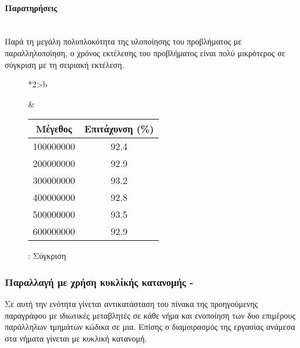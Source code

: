 \paragraph{Παρατηρήσεις}
\ \\
Παρά τη μεγάλη πολυπλοκότητα της υλοποίησης του προβλήματος με παραλληλοποίηση, ο χρόνος εκτέλεσης του προβλήματος είναι πολύ μικρότερος σε σύγκριση με τη σειριακή εκτέλεση.
\begin{figure}[h]
\begin{tabular}{*{2}{>{\centering\arraybackslash}b{}}}
\resizebox{0.4\textwidth}{!} {
\begin{tikzpicture}[state/.append style={minimum size=7mm}]
     \begin{axis}[
         xlabel={Μέγεθος},
         ylabel={Χρόνος},
         xmin=1e8, xmax=6e8,
         ymin=0, ymax=6.5,
         xtick={ 1e8, 2e8, 3e8, 4e8, 5e8, 6e8},
         ytick={ 0, 1, 2, 3, 4, 5, 6, 7 },
         legend pos=north west,
     ]
     	
 	\addplot[ color=red, mark=square,]
 	 	      coordinates {
          (1e8,0.081)(2e8,0.152)(3e8,0.217)(4e8,0.313)
			(5e8,0.349) 	(6e8, 0.449)
 	};
 	\addlegendentry{\en{Alt3}}
 	
 	\addplot[ color=blue, mark=triangle,]
      coordinates {
          (1e8, 1.076)(2e8,2.132)(3e8,3.188)(4e8,4.321 )
			(5e8,5.393)(6e8, 6.394) 	
 	};
 	\addlegendentry{\en{Alt1}}
     \end{axis}
 \end{tikzpicture}}
\caption{: Σύγκριση }
    &
\renewcommand{\arraystretch}{1.1}
\resizebox{0.4\textwidth}{!} {
\begin{tabular}{c|c}
Μέγεθος & Επιτάχυνση (\%)  \\
\hline
100000000 & 92.4\\
200000000 & 92.9\\
300000000 & 93.2\\
400000000 & 92.8\\
500000000 & 93.5\\
600000000 & 92.9\\
\end{tabular}}
\end{tabular}
\end{figure}
\clearpage
\subsubsection{Παραλλαγή με χρήση κυκλίκής κατανομής - }
Σε αυτή την ενότητα γίνεται αντικατάσταση του πίνακα  της προηγούμενης παραγράφου με ιδιωτικές μεταβλητές σε κάθε νήμα και ενοποίηση των δυο επιμέρους παράλληλων τμημάτων κώδικα σε μια. Επίσης ο διαμοιρασμός της εργασίας ανάμεσα στα νήματα γίνεται με κυκλική κατανομή.

